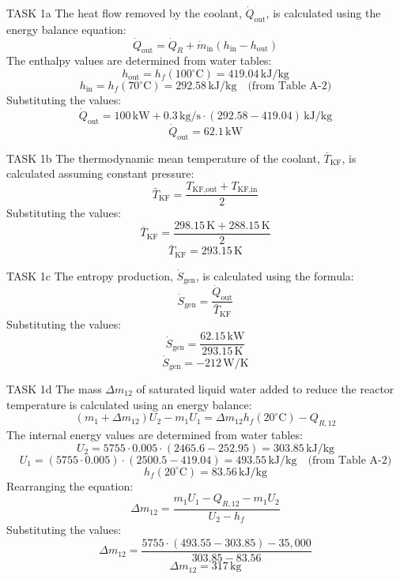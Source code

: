 TASK 1a  
The heat flow removed by the coolant, \( \dot{Q}_{\text{out}} \), is calculated using the energy balance equation:  
\[
\dot{Q}_{\text{out}} = \dot{Q}_R + \dot{m}_{\text{in}} (h_{\text{in}} - h_{\text{out}})
\]  
The enthalpy values are determined from water tables:  
\[
h_{\text{out}} = h_f(100^\circ\text{C}) = 419.04 \, \text{kJ/kg}
\]  
\[
h_{\text{in}} = h_f(70^\circ\text{C}) = 292.58 \, \text{kJ/kg} \quad \text{(from Table A-2)}
\]  
Substituting the values:  
\[
\dot{Q}_{\text{out}} = 100 \, \text{kW} + 0.3 \, \text{kg/s} \cdot (292.58 - 419.04) \, \text{kJ/kg}
\]  
\[
\dot{Q}_{\text{out}} = 62.1 \, \text{kW}
\]  

TASK 1b  
The thermodynamic mean temperature of the coolant, \( \bar{T}_{\text{KF}} \), is calculated assuming constant pressure:  
\[
\bar{T}_{\text{KF}} = \frac{T_{\text{KF,out}} + T_{\text{KF,in}}}{2}
\]  
Substituting the values:  
\[
\bar{T}_{\text{KF}} = \frac{298.15 \, \text{K} + 288.15 \, \text{K}}{2}
\]  
\[
\bar{T}_{\text{KF}} = 293.15 \, \text{K}
\]  

TASK 1c  
The entropy production, \( \dot{S}_{\text{gen}} \), is calculated using the formula:  
\[
\dot{S}_{\text{gen}} = \frac{\dot{Q}_{\text{out}}}{\bar{T}_{\text{KF}}}
\]  
Substituting the values:  
\[
\dot{S}_{\text{gen}} = \frac{62.15 \, \text{kW}}{293.15 \, \text{K}}
\]  
\[
\dot{S}_{\text{gen}} = -212 \, \text{W/K}
\]  

TASK 1d  
The mass \( \Delta m_{12} \) of saturated liquid water added to reduce the reactor temperature is calculated using an energy balance:  
\[
(m_1 + \Delta m_{12}) U_2 - m_1 U_1 = \Delta m_{12} h_f(20^\circ\text{C}) - Q_{R,12}
\]  
The internal energy values are determined from water tables:  
\[
U_2 = 5755 \cdot 0.005 \cdot (2465.6 - 252.95) = 303.85 \, \text{kJ/kg}
\]  
\[
U_1 = (5755 \cdot 0.005) \cdot (2500.5 - 419.04) = 493.55 \, \text{kJ/kg} \quad \text{(from Table A-2)}
\]  
\[
h_f(20^\circ\text{C}) = 83.56 \, \text{kJ/kg}
\]  
Rearranging the equation:  
\[
\Delta m_{12} = \frac{m_1 U_1 - Q_{R,12} - m_1 U_2}{U_2 - h_f}
\]  
Substituting the values:  
\[
\Delta m_{12} = \frac{5755 \cdot (493.55 - 303.85) - 35,000}{303.85 - 83.56}
\]  
\[
\Delta m_{12} = 317 \, \text{kg}
\]